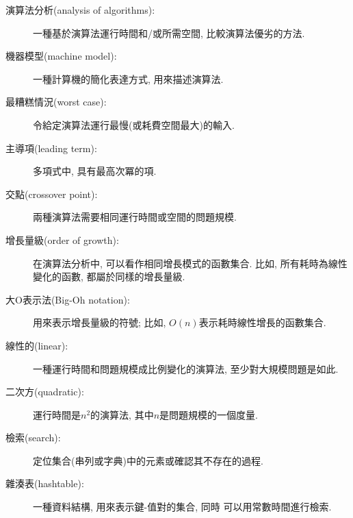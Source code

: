 \documentclass[10pt]{book}
\begin{document}
\begin{description}

\item[演算法分析(analysis of algorithms):] 一種基於演算法運行時間和/或所需空間, 比較演算法優劣的方法. 

\item[機器模型(machine model):] 一種計算機的簡化表達方式, 用來描述演算法.

\item[最糟糕情況(worst case):] 令給定演算法運行最慢(或耗費空間最大)的輸入.

\item[主導項(leading term):] 多項式中, 具有最高次冪的項.

\item[交點(crossover point):] 兩種演算法需要相同運行時間或空間的問題規模.

\item[增長量級(order of growth):] 在演算法分析中, 可以看作相同增長模式的函數集合.
比如, 所有耗時為線性變化的函數, 都屬於同樣的增長量級.

\item[大O表示法(Big-Oh notation):] 用來表示增長量級的符號;
比如, $O(n)$表示耗時線性增長的函數集合. 

\item[線性的(linear):] 一種運行時間和問題規模成比例變化的演算法,
至少對大規模問題是如此.

\item[二次方(quadratic):] 運行時間是$n^2$的演算法, 其中$n$是問題規模的一個度量. 

\item[檢索(search):] 定位集合(串列或字典)中的元素或確認其不存在的過程.

\item[雜湊表(hashtable):] 一種資料結構, 用來表示鍵-值對的集合, 同時
可以用常數時間進行檢索.

\end{description}


\printindex

\clearemptydoublepage
\end{document}
